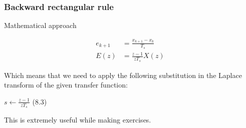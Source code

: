 \begin{frame}
	\frametitle{Backward rectangular rule}
	\begin{block}{Mathematical approach}
		\begin{center}
			\begin{align*}
			e_{k+1} &= \frac{x_{k+1} - x_{k}}{T_s}\\
			E(z) &= \frac{z -1}{zT_s} X(z)
			\end{align*}
		\end{center}
		Which means that we need to apply the following substitution in the Laplace transform of the given transfer function:
		\begin{center}
			$s \gets \frac{z-1}{zT_s}$ (8.3)
		\end{center}
		This is extremely useful while making exercises.
	\end{block}
\end{frame}

